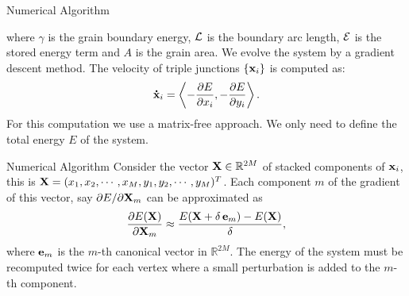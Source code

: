 \documentclass[usenames,dvipsnames]{beamer}
\begin{document}
\begin{frame}{Numerical Algorithm}
\begin{minipage}{0.4\textwidth}
\begin{figure}[t]
\end{figure}
\end{minipage}

where $\gamma$ is the grain boundary energy, $\mathcal{L}$ is the boundary arc length, $\mathcal{E}$ is the stored energy term and $A$ is the grain area. We evolve the system by a gradient descent method. The velocity of triple junctions $\{\x_i\}$ is computed as:
\begin{equation*}
    \dotx_i = \left\langle -\frac{\partial E}{\partial x_i}, -\frac{\partial E}{\partial y_i} \right\rangle.
\end{equation*}
For this computation we use a {\color{red}matrix-free} approach. We only need to define the total energy $E$ of the system.
\end{frame}

\begin{frame}{Numerical Algorithm}
Consider the vector $\X \in \mathbb{R}^{2M}$ of stacked components of
$\x_i$, this is $
    \X = (x_1, x_2, \cdots, x_M, y_1, y_2, \cdots, y_M)^T$. Each component $m$ of the gradient of this vector, say $\partial E / \partial \X_m$ can be approximated as
\begin{equation*}
    \frac{\partial E(\X)}{\partial \X_m} \approx \frac{E(\X + \delta\,  \ei{m}) - E(\X)}{\delta},
\end{equation*}
where $\mathbf{e}_{m}$ is the $m$-th canonical vector in $\mathbb{R}^{2M}$. The energy of the system must be recomputed twice for each vertex where a small perturbation is added to the $m$-th component.
\end{frame}
\end{document}
